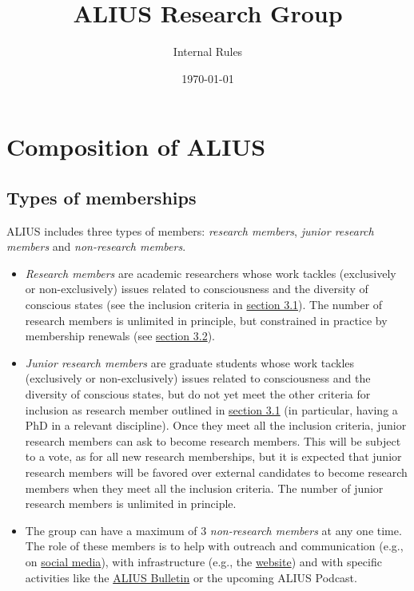 \documentclass[a4paper, 11pt]{scrartcl}
\begin{document}
\title{\vspace{-2cm} \LARGE ALIUS Research Group}
\subtitle{\Large Internal Rules}
\author{}
\date{\large \today}
\maketitle

\section{Composition of ALIUS}
\subsection{Types of memberships}

ALIUS includes three types of members: \emph{research members}, \emph{junior research members} and \emph{non-research members}.

\begin{itemize}

\item \emph{Research members} are academic researchers whose work tackles (exclusively or non-exclusively) issues related to consciousness and the diversity of conscious states (see the inclusion criteria in \hyperref[new_memberships]{section 3.1}). The number of research members is unlimited in principle, but constrained in practice by membership renewals (see \hyperref[membership_renewal]{section 3.2}). 

\item \emph{Junior research members} are graduate students whose work tackles (exclusively or non-exclusively) issues related to consciousness and the diversity of conscious states, but do not yet meet the other criteria for inclusion as research member outlined in \hyperref[new_memberships]{section 3.1} (in particular, having a PhD in a relevant discipline). Once they meet all the inclusion criteria, junior research members can ask to become research members. This will be subject to a vote, as for all new research memberships, but it is expected that junior research members will be favored over external candidates to become research members when they meet all the inclusion criteria. The number of junior research members is unlimited in principle. 

\item The group can have a maximum of 3 \emph{non-research members} at any one time. The role of these members is to help with outreach and communication (e.g., on \href{https://www.facebook.com/aliusresearch/}{social media}), with infrastructure (e.g., the \href{https://www.aliusresearch.org/}{website}) and with specific activities like the \href{https://www.aliusresearch.org/bulletin.html}{ALIUS Bulletin} or the upcoming ALIUS Podcast.


\end{itemize}
\end{document}
